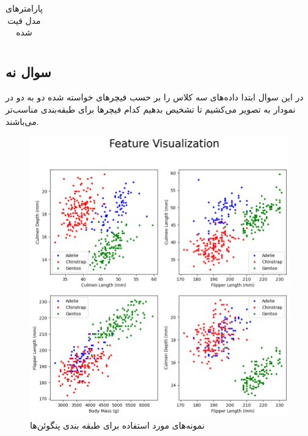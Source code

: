 \documentclass[12pt,onecolumn,a4paper]{article}
\begin{document}
\begin{center}
\begin{table}[h]
\begin{centering}
\begin{tabular}{|c|ccc|ccc|}
        \end{tabular}
    \end{centering}
    \caption{پارامترهای مدل فیت شده}
\end{table}
\end{center}

\newpage
\subsection{سوال نه}
در این سوال ابتدا داده‌های سه کلاس را بر حسب فیچرهای خواسته شده دو به دو در نمودار به تصویر می‌کشیم تا تشخیص بدهیم کدام فیچرها برای طبقه‌بندی مناسب‌تر می‌باشند.

\begin{figure}[h!]
    \label{fig:3}
    \begin{center}
    \includegraphics[scale=0.6]{q9_feature_comp.png}
    \caption{نمونه‌های مورد استفاده برای طبقه بندی پنگوئن‌ها}
    \end{center}
\end{figure}
\end{document}
